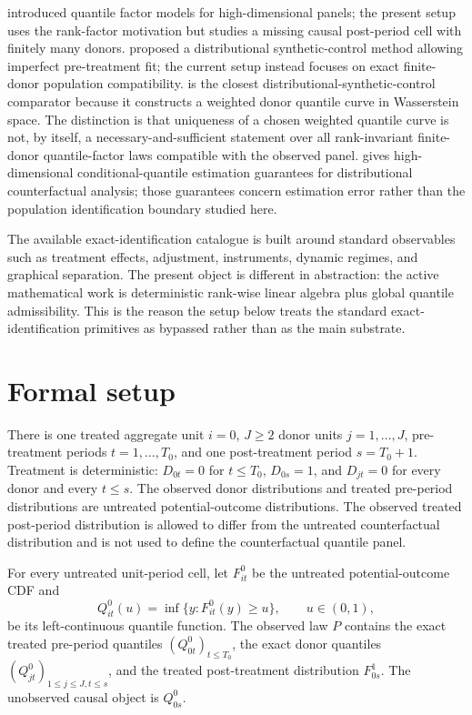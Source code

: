 \documentclass[11pt]{article}
\theoremstyle{definition}
\theoremstyle{plain}
\theoremstyle{remark}
\begin{document}
\cite{ChenDoladoGonzalo2021QFM} introduced quantile factor models for high-dimensional panels; the present setup uses the rank-factor motivation but studies a missing causal post-period cell with finitely many donors.  \cite{Chen2020DistributionalSC} proposed a distributional synthetic-control method allowing imperfect pre-treatment fit; the current setup instead focuses on exact finite-donor population compatibility.  \cite{Gunsilius2023DiSCo} is the closest distributional-synthetic-control comparator because it constructs a weighted donor quantile curve in Wasserstein space.  The distinction is that uniqueness of a chosen weighted quantile curve is not, by itself, a necessary-and-sufficient statement over all rank-invariant finite-donor quantile-factor laws compatible with the observed panel.  \cite{Masini2025DCA} gives high-dimensional conditional-quantile estimation guarantees for distributional counterfactual analysis; those guarantees concern estimation error rather than the population identification boundary studied here.

The available exact-identification catalogue is built around standard observables such as treatment effects, adjustment, instruments, dynamic regimes, and graphical separation.  The present object is different in abstraction: the active mathematical work is deterministic rank-wise linear algebra plus global quantile admissibility.  This is the reason the setup below treats the standard exact-identification primitives as bypassed rather than as the main substrate.

\section{Formal setup}
There is one treated aggregate unit \(i=0\), \(J\ge2\) donor units \(j=1,\ldots,J\), pre-treatment periods \(t=1,\ldots,T_0\), and one post-treatment period \(s=T_0+1\).  Treatment is deterministic: \(D_{0t}=0\) for \(t\le T_0\), \(D_{0s}=1\), and \(D_{jt}=0\) for every donor and every \(t\le s\).  The observed donor distributions and treated pre-period distributions are untreated potential-outcome distributions.  The observed treated post-period distribution is allowed to differ from the untreated counterfactual distribution and is not used to define the counterfactual quantile panel.

For every untreated unit-period cell, let \(F^0_{it}\) be the untreated potential-outcome CDF and
\[
Q^0_{it}(u)=\inf\{y:F^0_{it}(y)\ge u\},\qquad u\in(0,1),
\]
be its left-continuous quantile function.  The observed law \(P\) contains the exact treated pre-period quantiles \((Q^0_{0t})_{t\le T_0}\), the exact donor quantiles \((Q^0_{jt})_{1\le j\le J,t\le s}\), and the treated post-treatment distribution \(F^1_{0s}\).  The unobserved causal object is \(Q^0_{0s}\).
\end{document}
